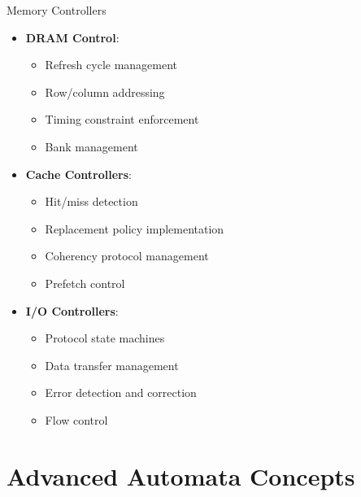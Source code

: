 \documentclass[aspectratio=169,11pt]{beamer}
\newcommand{\concept}[1]{\textbf{\color{accentcolor}#1}}
\begin{document}
\begin{frame}{Memory Controllers}
\begin{itemize}
\item \concept{DRAM Control}:
\begin{itemize}
\item Refresh cycle management
\item Row/column addressing
\item Timing constraint enforcement
\item Bank management
\end{itemize}
\vspace{0.5cm}
\item \concept{Cache Controllers}:
\begin{itemize}
\item Hit/miss detection
\item Replacement policy implementation
\item Coherency protocol management
\item Prefetch control
\end{itemize}
\vspace{0.3cm}
\item \concept{I/O Controllers}:
\begin{itemize}
\item Protocol state machines
\item Data transfer management
\item Error detection and correction
\item Flow control
\end{itemize}
\end{itemize}
\end{frame}

\section{Advanced Automata Concepts}
\end{document}
